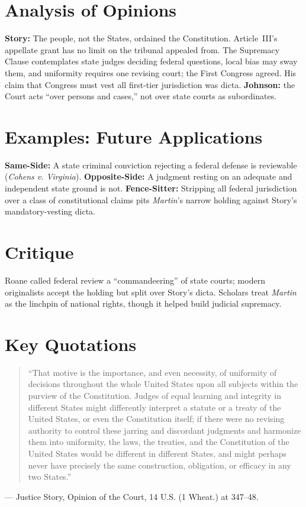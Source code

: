\documentclass[12pt]{article}
\begin{document}
\section{Analysis of Opinions}
\textbf{Story:} The people, not the States, ordained the Constitution. Article~III's appellate grant has no limit on the tribunal appealed from. The Supremacy Clause contemplates state judges deciding federal questions, local bias may sway them, and uniformity requires one revising court; the First Congress agreed. His claim that Congress must vest all first-tier jurisdiction was dicta. \textbf{Johnson:} the Court acts ``over persons and cases,'' not over state courts as subordinates.

\section{Examples: Future Applications}
\textbf{Same-Side:} A state criminal conviction rejecting a federal defense is reviewable (\textit{Cohens v. Virginia}). \textbf{Opposite-Side:} A judgment resting on an adequate and independent state ground is not. \textbf{Fence-Sitter:} Stripping all federal jurisdiction over a class of constitutional claims pits \textit{Martin}'s narrow holding against Story's mandatory-vesting dicta.

\section{Critique}
Roane called federal review a ``commandeering'' of state courts; modern originalists accept the holding but split over Story's dicta. Scholars treat \textit{Martin} as the linchpin of national rights, though it helped build judicial supremacy.

\section{Key Quotations}
\begin{quote}
``That motive is the importance, and even necessity, of uniformity of decisions throughout the whole United States upon all subjects within the purview of the Constitution. Judges of equal learning and integrity in different States might differently interpret a statute or a treaty of the United States, or even the Constitution itself; if there were no revising authority to control these jarring and discordant judgments and harmonize them into uniformity, the laws, the treaties, and the Constitution of the United States would be different in different States, and might perhaps never have precisely the same construction, obligation, or efficacy in any two States.''
\end{quote}
\noindent --- Justice Story, Opinion of the Court, 14 U.S. (1 Wheat.) at 347--48.
\end{document}
